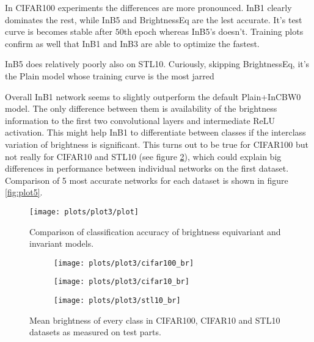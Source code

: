     In CIFAR100 experiments the differences are more pronounced. InB1 clearly
    dominates the rest, while InB5 and BrightnessEq are the lest accurate.
    It's test curve is becomes stable after $50$th epoch whereas InB5's doesn't.
    Training plots confirm as well that InB1 and InB3 are able to optimize the
    fastest.

    InB5 does relatively poorly also on STL10. Curiously, skipping BrightnessEq,
    it's the Plain model whose training curve is the most jarred

    Overall InB1 network seems to slightly outperform the default Plain+InCBW0
    model.
    The only difference between them is availability of the
    brightness information to the first two convolutional layers and
    intermediate ReLU activation. This might help InB1 to differentiate between
    classes if the interclass variation of brightness is significant. This
    turns out to be true
    for CIFAR100 but not really for CIFAR10 and STL10 (see figure
    \ref{fig:plot3brightness}), which could explain big differences in
    performance between individual networks on the first dataset.
    Comparison of 5 most accurate networks for each dataset is shown in figure
    \ref{fig:plot5}.



    \begin{figure}[h!]
        \centering
        \texttt{[image: plots/plot3/plot]}
        \caption{Comparison of classification accuracy of
        brightness equivariant and invariant models.}
        \label{fig:plot3}
    \end{figure}

    \begin{figure}[h!]
        \centering
        \begin{subfigure}{0.8\textwidth}
            \texttt{[image: plots/plot3/cifar100\_br]}
        \end{subfigure}
        \begin{subfigure}{0.8\textwidth}
            \texttt{[image: plots/plot3/cifar10\_br]}
        \end{subfigure}
        \begin{subfigure}{0.8\textwidth}
            \texttt{[image: plots/plot3/stl10\_br]}
        \end{subfigure}
        \caption{Mean brightness of every class in CIFAR100, CIFAR10 and STL10
            datasets as measured on test parts.}
        \label{fig:plot3brightness}
    \end{figure}

